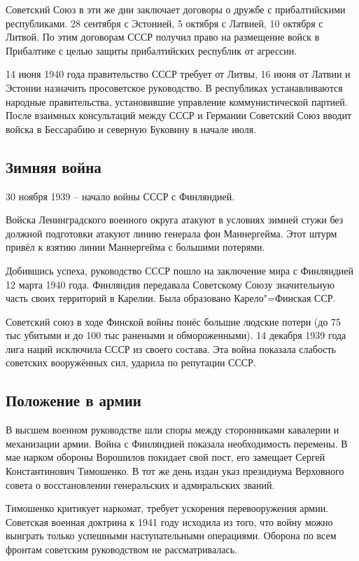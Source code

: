 Советский Союз в эти же дни заключает договоры о дружбе с прибалтийскими республиками. 28 сентября с Эстонией, 5 октября с Латвией, 10 октября с Литвой. По этим договорам СССР получил право на размещение войск в Прибалтике с целью защиты прибалтийских республик от агрессии.

14 июня 1940 года правительство СССР требует от Литвы, 16 июня от Латвии и Эстонии назначить просоветское руководство. В республиках устанавливаются народные правительства, установившие управление коммунистической партией. После взаимных консультаций между СССР и Германии Советский Союз вводит войска в Бессарабию и северную Буковину в начале июля.

\subsection{Зимняя война}

30 ноября 1939 -- начало войны СССР с Финляндией.

Войска Ленинградского военного округа атакуют в условиях зимней стужи без должной подготовки атакуют линию генерала фон Маннергейма. Этот штурм привёл к взятию линии Маннергейма с большими потерями.

Добившись успеха, руководство СССР пошло на заключение мира с Финляндией 12 марта 1940 года. Финляндия передавала Советскому Союзу значительную часть своих территорий в Карелии. Была образовано Карело"=Финская ССР.

Советский союз в ходе Финской войны понёс большие людские потери (до 75 тыс убитыми и до 100 тыс ранеными и обмороженными). 14 декабря 1939 года лига наций исключила СССР из своего состава. Эта война показала слабость советских вооружённых сил, ударила по репутации СССР.

\subsection{Положение в армии}
В высшем военном руководстве шли споры между сторонниками кавалерии и механизации армии.
Война с Финляндией показала необходимость перемены. В мае нарком обороны Ворошилов покидает свой пост, его замещает Сергей Константинович Тимошенко. В тот же день издан указ президиума Верховного совета о восстановлении генеральских и адмиральских званий.

Тимошенко критикует наркомат, требует ускорения перевооружения армии. Советская военная доктрина к 1941 году исходила из того, что войну можно выиграть только успешными наступательными операциями. Оборона по всем фронтам советским руководством не рассматривалась.

